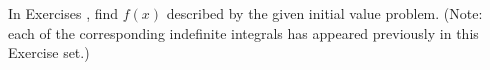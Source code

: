 {\noindent In Exercises}
{, find $f(x)$ described by the given initial value problem.  (Note: each of the corresponding indefinite integrals has appeared previously in this Exercise set.)}
